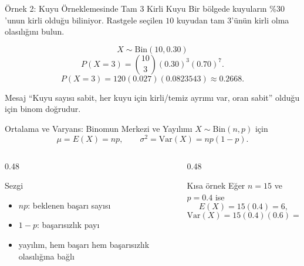 \documentclass[light]{lutbeamer}
\begin{document}
\begin{frame}{Örnek 2: Kuyu Örneklemesinde Tam 3 Kirli Kuyu}
    \small
    Bir bölgede kuyuların \(\%30\)'unun kirli olduğu biliniyor. Rastgele seçilen \(10\) kuyudan tam \(3\)'ünün kirli olma olasılığını bulun.

    \vspace{0.2cm}
    \[
    X \sim \mathrm{Bin}(10,0.30)
    \]
    \[
    P(X=3)=\binom{10}{3}(0.30)^3(0.70)^7.
    \]
    \[
    P(X=3)=120(0.027)(0.0823543)\approx 0.2668.
    \]

    \begin{alertblock}{Mesaj}
        ``Kuyu sayısı sabit, her kuyu için kirli/temiz ayrımı var, oran sabit'' olduğu için binom doğrudur.
    \end{alertblock}
\end{frame}

\begin{frame}{Ortalama ve Varyans: Binomun Merkezi ve Yayılımı}
    \small
    \(X \sim \mathrm{Bin}(n,p)\) için
    \[
    \mu = E(X)=np, \qquad \sigma^2=\mathrm{Var}(X)=np(1-p).
    \]

    \begin{columns}[T]
        \begin{column}{0.48\textwidth}
            \begin{block}{Sezgi}
                \begin{itemize}
                    \item \(np\): beklenen başarı sayısı
                    \item \(1-p\): başarısızlık payı
                    \item yayılım, hem başarı hem başarısızlık olasılığına bağlı
                \end{itemize}
            \end{block}
        \end{column}
        \begin{column}{0.48\textwidth}
            \begin{exampleblock}{Kısa örnek}
                Eğer \(n=15\) ve \(p=0.4\) ise
                \[
                E(X)=15(0.4)=6,
                \]
                \[
                \mathrm{Var}(X)=15(0.4)(0.6)=3.6.
                \]
            \end{exampleblock}
        \end{column}
    \end{columns}
\end{frame}
\end{document}
